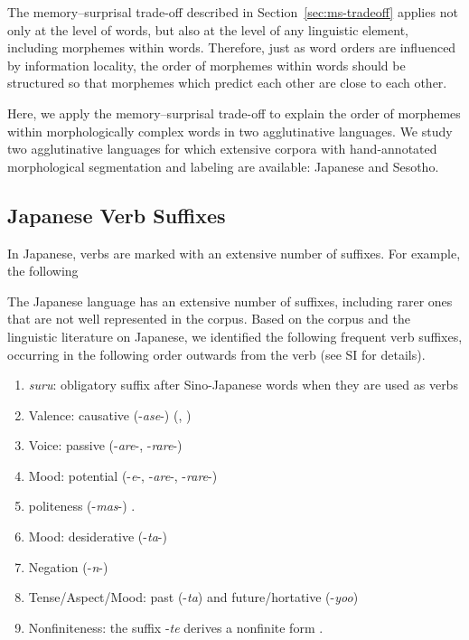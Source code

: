 
The memory--surprisal trade-off described in Section~\ref{sec:ms-tradeoff} applies not only at the level of words, but also at the level of any linguistic element, including morphemes within words. Therefore, just as word orders are influenced by information locality, the order of morphemes within words should be structured so that morphemes which predict each other are close to each other.

Here, we apply the memory--surprisal trade-off to explain the order of morphemes within morphologically complex words in two agglutinative languages. We study two agglutinative languages for which extensive corpora with hand-annotated morphological segmentation and labeling are available: Japanese and Sesotho.


\subsection{Japanese Verb Suffixes}

In Japanese, verbs are marked with an extensive number of suffixes. For example, the following 

The Japanese language has an extensive number of suffixes, including rarer ones that are not well represented in the corpus.
Based on the corpus and the linguistic literature on Japanese, we identified the following frequent verb suffixes, occurring in the following order outwards from the verb (see SI for details).


\begin{enumerate}
\item \textit{suru}: obligatory suffix after Sino-Japanese words when they are used as verbs
\item Valence: causative (-\textit{ase}-) (\citet[142]{hasegawa2014japanese}, \citet[Chapter 13]{kaiser2013japanese})
\item Voice: passive (-\textit{are}-, -\textit{rare}-) \cite[152]{hasegawa2014japanese} \cite[Chapter 12]{kaiser2013japanese}
\item Mood: potential (-\textit{e}-, -\textit{are}-, -\textit{rare}-)  
\item politeness (-\textit{mas}-) \cite[190]{kaiser2013japanese}.
\item Mood: desiderative (-\textit{ta}-) \cite[238]{kaiser2013japanese}
\item Negation (-\textit{n}-)
\item Tense/Aspect/Mood: past (-\textit{ta}) and future/hortative (-\textit{yoo}) \cite[229]{kaiser2013japanese}
\item Nonfiniteness: the suffix -\textit{te} derives a nonfinite form \cite[186]{kaiser2013japanese}.
\end{enumerate}

